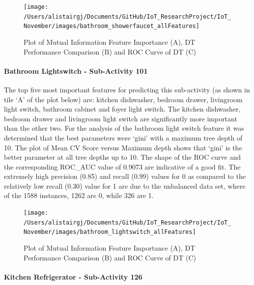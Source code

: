 \documentclass[11pt,]{article}
\let\oldparagraph\paragraph
\renewcommand{\paragraph}[1]{\oldparagraph{#1}\mbox{}}
\begin{document}
\begin{figure}[H]

{\centering \texttt{[image: /Users/alistairgj/Documents/GitHub/IoT\_ResearchProject/IoT\_November/images/bathroom\_showerfaucet\_allFeatures]} 

}

\caption{Plot of Mutual Information Feature Importance (A), DT Performance Comparison (B) and ROC Curve of DT (C)}\label{fig:unnamed-chunk-12}
\end{figure}

\hypertarget{bathroom-lightswitch---sub-activity-101-1}{%
\paragraph{Bathroom Lightswitch - Sub-Activity
101}\label{bathroom-lightswitch---sub-activity-101-1}}

The top five most important features for predicting this sub-activity
(as shown in tile `A' of the plot below) are: kitchen dishwasher,
bedroom drawer, livingroom light switch, bathroom cabinet and foyer
light switch. The kitchen dishwasher, bedroom drawer and livingroom
light switch are significantly more important than the other two. For
the analysis of the bathroom light switch feature it was determined that
the best parameters were `gini' with a maximum tree depth of 10. The
plot of Mean CV Score versus Maximum depth shows that `gini' is the
better parameter at all tree depths up to 10. The shape of the ROC curve
and the corresponding ROC\_AUC value of 0.9073 are indicative of a good
fit. The extremely high precision (0.85) and recall (0.99) values for 0
as compared to the relatively low recall (0.30) value for 1 are due to
the unbalanced data set, where of the 1588 instances, 1262 are 0, while
326 are 1.

\begin{figure}[H]

{\centering \texttt{[image: /Users/alistairgj/Documents/GitHub/IoT\_ResearchProject/IoT\_November/images/bathroom\_lightswitch\_allFeatures]} 

}

\caption{Plot of Mutual Information Feature Importance (A), DT Performance Comparison (B) and ROC Curve of DT (C)}\label{fig:unnamed-chunk-13}
\end{figure}

\hypertarget{kitchen-refrigerator---sub-activity-126-1}{%
\paragraph{Kitchen Refrigerator - Sub-Activity
126}\label{kitchen-refrigerator---sub-activity-126-1}}
\end{document}
